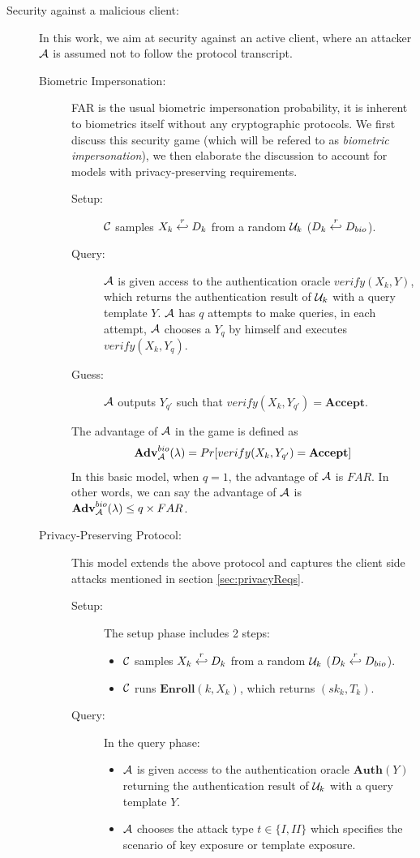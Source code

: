 \begin{description}
\item[Security against a malicious client:] In this work, we aim at security against an active client, where an attacker
  $\mathcal{A}$ is assumed not to follow the protocol transcript.
  \begin{description}
  \item[Biometric Impersonation:] FAR is the usual biometric impersonation probability, it is inherent to biometrics
    itself without any cryptographic protocols. We first discuss this security game (which will be refered to as
    \textit{biometric impersonation}), we then elaborate the discussion to account for models with privacy-preserving
    requirements.
    \begin{description}
    \item[Setup:] $\mathcal{C}$ samples $X_k \stackrel{r}{\hookleftarrow} D_{k}$ from a random $\mathcal{U}_k$ ($D_k \stackrel{r}{\hookleftarrow} D_{bio}$).
    \item[Query:] $\mathcal{A}$ is given access to the authentication oracle $verify(X_k,Y)$, which returns the
      authentication result of $\mathcal{U}_k$ with a query template $Y$. $\mathcal{A}$ has $q$ attempts to make queries, in
      each attempt, $\mathcal{A}$ chooses a $Y_{q}$ by himself and executes $verify(X_k,Y_{q})$.
    \item[Guess:] $\mathcal{A}$ outputs $Y_{q'}$ such that $verify(X_k,Y_{q'}) = \textbf{Accept}$.
    \end{description}
    The advantage of $\mathcal{A}$ in the game is defined as
    \[
      \textbf{Adv}^{bio}_{\mathcal{A}}(\lambda) = Pr[verify(X_k,Y_{q'}) = \mathbf{Accept}]
    \]
    In this basic model, when $q=1$, the advantage of $\mathcal{A}$ is $FAR$.  In other words, we can say the advantage of
    $\mathcal{A}$ is $ \textbf{Adv}^{bio}_{\mathcal{A}}(\lambda) \leq q\times FAR$.

  \item[Privacy-Preserving Protocol:] This model extends the above protocol and captures the client side attacks
    mentioned in section \ref{sec:privacyReqs}.
    \begin{description}
    \item[Setup:] The setup phase includes 2 steps:
      \begin{itemize}
      \item $\mathcal{C}$ samples $X_k \stackrel{r}{\hookleftarrow} D_{k}$ from a random $\mathcal{U}_k$ ($D_k \stackrel{r}{\hookleftarrow} D_{bio}$).
      \item $\mathcal{C}$ runs $\textbf{Enroll}(k, X_k)$, which returns $(sk_k, T_k)$.
      \end{itemize}
    \item[Query:] In the query phase:
      \begin{itemize}
      \item $\mathcal{A}$ is given access to the authentication oracle $\mathbf{Auth}(Y)$ returning the authentication
        result of $\mathcal{U}_k$ with a query template $Y$.
      \item $\mathcal{A}$ chooses the attack type $t \in \{I,II\}$ which specifies the scenario of key exposure or template
        exposure.


\end{itemize}
\end{description}
\end{description}
\end{description}
